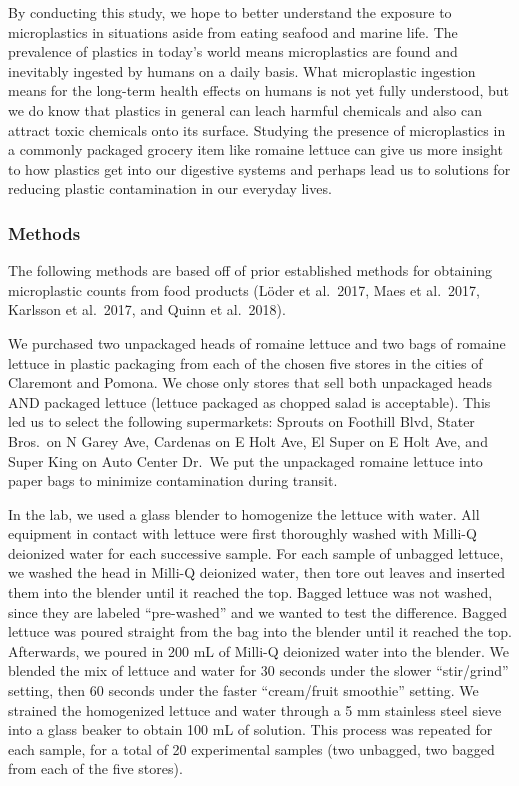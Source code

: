 \documentclass[]{article}
\begin{document}
By conducting this study, we hope to better understand the exposure to
microplastics in situations aside from eating seafood and marine life.
The prevalence of plastics in today's world means microplastics are
found and inevitably ingested by humans on a daily basis. What
microplastic ingestion means for the long-term health effects on humans
is not yet fully understood, but we do know that plastics in general can
leach harmful chemicals and also can attract toxic chemicals onto its
surface. Studying the presence of microplastics in a commonly packaged
grocery item like romaine lettuce can give us more insight to how
plastics get into our digestive systems and perhaps lead us to solutions
for reducing plastic contamination in our everyday lives.

\hypertarget{methods}{%
\subsubsection{Methods}\label{methods}}

The following methods are based off of prior established methods for
obtaining microplastic counts from food products (Löder et al.~2017,
Maes et al.~2017, Karlsson et al.~2017, and Quinn et al.~2018).

We purchased two unpackaged heads of romaine lettuce and two bags of
romaine lettuce in plastic packaging from each of the chosen five stores
in the cities of Claremont and Pomona. We chose only stores that sell
both unpackaged heads AND packaged lettuce (lettuce packaged as chopped
salad is acceptable). This led us to select the following supermarkets:
Sprouts on Foothill Blvd, Stater Bros.~on N Garey Ave, Cardenas on E
Holt Ave, El Super on E Holt Ave, and Super King on Auto Center Dr.~We
put the unpackaged romaine lettuce into paper bags to minimize
contamination during transit.

In the lab, we used a glass blender to homogenize the lettuce with
water. All equipment in contact with lettuce were first thoroughly
washed with Milli-Q deionized water for each successive sample. For each
sample of unbagged lettuce, we washed the head in Milli-Q deionized
water, then tore out leaves and inserted them into the blender until it
reached the top. Bagged lettuce was not washed, since they are labeled
``pre-washed'' and we wanted to test the difference. Bagged lettuce was
poured straight from the bag into the blender until it reached the top.
Afterwards, we poured in 200 mL of Milli-Q deionized water into the
blender. We blended the mix of lettuce and water for 30 seconds under
the slower ``stir/grind'' setting, then 60 seconds under the faster
``cream/fruit smoothie'' setting. We strained the homogenized lettuce
and water through a 5 mm stainless steel sieve into a glass beaker to
obtain 100 mL of solution. This process was repeated for each sample,
for a total of 20 experimental samples (two unbagged, two bagged from
each of the five stores).
\end{document}
